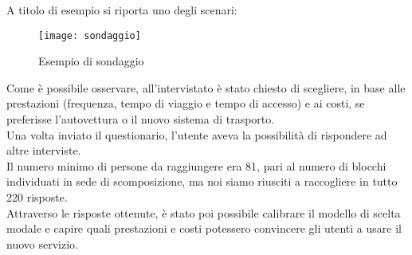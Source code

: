 \documentclass{article}
\begin{document}
A titolo di esempio si riporta uno degli scenari:
\begin{figure}[H]
\centering
\texttt{[image: sondaggio]}
\caption{Esempio di sondaggio}
\end{figure}
Come è possibile osservare, all’intervistato è stato chiesto di scegliere, in base alle prestazioni (frequenza, tempo di viaggio e tempo di accesso) e ai costi, se preferisse l’autovettura o il nuovo sistema di trasporto.\\
Una volta inviato il questionario, l’utente aveva la possibilità di rispondere ad altre interviste.\\
Il numero minimo di persone da raggiungere era 81, pari al numero di blocchi individuati in sede di scomposizione, ma noi siamo riusciti a raccogliere in tutto 220 risposte.\\
Attraverso le risposte ottenute, è stato poi possibile calibrare il modello di scelta modale e capire quali prestazioni e costi potessero convincere gli utenti a usare il nuovo servizio.
\end{document}
